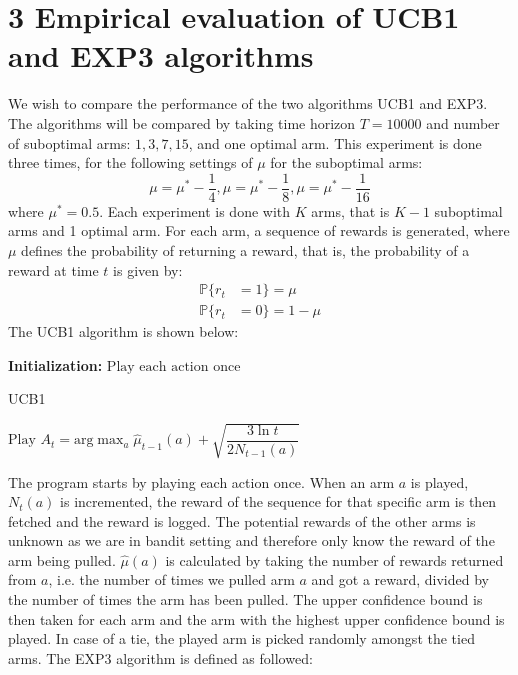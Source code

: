 \documentclass{article}
\begin{document}
\section{3 Empirical evaluation of UCB1 and EXP3 algorithms}
We wish to compare the performance of the two algorithms UCB1 and EXP3. The algorithms will be compared by taking time horizon $T = 10000$ and number of suboptimal arms: $1,3,7,15$, and one optimal arm.  This experiment is done three times, for the following settings of $\mu$ for the suboptimal arms:
\begin{equation*}
\mu = \mu^* - \frac{1}{4}, \mu = \mu^* - \frac{1}{8}, \mu = \mu^* - \frac{1}{16}
\end{equation*}
where $\mu^* = 0.5$. Each experiment is done with $K$ arms, that is $K-1$ suboptimal arms and 1 optimal arm. For each arm, a sequence of rewards is generated, where $\mu$ defines the probability of returning a reward, that is, the probability of a reward at time $t$ is given by:
\begin{align}
\mathbb{P}\lbrace r_t &= 1 \rbrace = \mu \\
\mathbb{P}\lbrace r_t &= 0 \rbrace = 1 - \mu
\end{align}
The UCB1 algorithm is shown below:
\begin{algorithm}[H]
\hspace*{\algorithmicindent}\textbf{Initialization:} $\text{Play each action once}$
\caption{UCB1}\label{euclid}
\begin{algorithmic}[1]
\State $\text{Play } A_t = \text{arg} \max_{a} \hat{\mu}_{t-1}(a) + \sqrt{\dfrac{3 \ln t}{2 N_{t-1}(a)}} $
\EndFor
\end{algorithmic}
\end{algorithm}
The program starts by playing each action once. When an arm $a$ is played, $N_t(a)$ is incremented, the reward of the sequence for that specific arm is then fetched and the reward is logged. The potential rewards of the other arms is unknown as we are in bandit setting and therefore only know the reward of the arm being pulled. $\hat{\mu}(a)$ is calculated by taking the number of rewards returned from $a$, i.e. the number of times we pulled arm $a$ and got a reward, divided by the number of times the arm has been pulled. The upper confidence bound is then taken for each arm and the arm with the highest upper confidence bound is played. In case of a tie, the played arm is picked randomly amongst the tied arms. The EXP3 algorithm is defined as followed:
\end{document}
